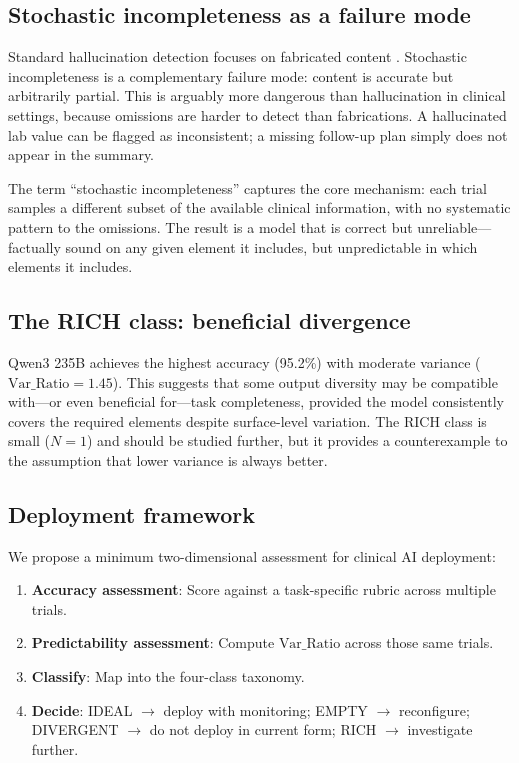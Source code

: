 \documentclass[11pt,a4paper]{article}
\begin{document}
\subsection{Stochastic incompleteness as a failure mode}

Standard hallucination detection focuses on fabricated content \citep{asgari2025framework}. Stochastic incompleteness is a complementary failure mode: content is accurate but arbitrarily partial. This is arguably more dangerous than hallucination in clinical settings, because omissions are harder to detect than fabrications. A hallucinated lab value can be flagged as inconsistent; a missing follow-up plan simply does not appear in the summary.

The term ``stochastic incompleteness'' captures the core mechanism: each trial samples a different subset of the available clinical information, with no systematic pattern to the omissions. The result is a model that is correct but unreliable---factually sound on any given element it includes, but unpredictable in which elements it includes.

\subsection{The RICH class: beneficial divergence}

Qwen3 235B achieves the highest accuracy (95.2\%) with moderate variance ($\text{Var\_Ratio} = 1.45$). This suggests that some output diversity may be compatible with---or even beneficial for---task completeness, provided the model consistently covers the required elements despite surface-level variation. The RICH class is small ($N = 1$) and should be studied further, but it provides a counterexample to the assumption that lower variance is always better.

\subsection{Deployment framework}

We propose a minimum two-dimensional assessment for clinical AI deployment:

\begin{enumerate}
    \item \textbf{Accuracy assessment}: Score against a task-specific rubric across multiple trials.
    \item \textbf{Predictability assessment}: Compute $\text{Var\_Ratio}$ across those same trials.
    \item \textbf{Classify}: Map into the four-class taxonomy.
    \item \textbf{Decide}: IDEAL $\to$ deploy with monitoring; EMPTY $\to$ reconfigure; DIVERGENT $\to$ do not deploy in current form; RICH $\to$ investigate further.
\end{enumerate}
\end{document}
